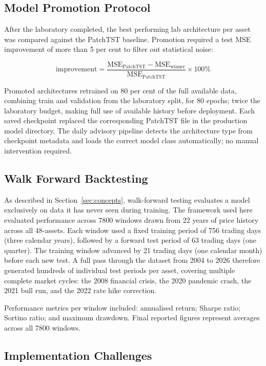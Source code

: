 \documentclass[journal]{IEEEtran}
\begin{document}
\subsection{Model Promotion Protocol}

After the laboratory completed, the best performing lab architecture per
asset was compared against the PatchTST baseline. Promotion required a
test MSE improvement of more than 5 per cent to filter out statistical
noise:

\begin{equation}
\text{improvement} = \frac{\text{MSE}_{\text{PatchTST}} -
\text{MSE}_{\text{winner}}}{\text{MSE}_{\text{PatchTST}}}
\times 100\%
\end{equation}

Promoted architectures retrained on 80 per cent of the full available
data, combining train and validation from the laboratory split, for 80
epochs; twice the laboratory budget, making full use of available history
before deployment. Each saved checkpoint replaced the corresponding
PatchTST file in the production model directory. The daily advisory
pipeline detects the architecture type from checkpoint metadata and loads
the correct model class automatically; no manual intervention required.

\subsection{Walk Forward Backtesting}

As described in Section~\ref{sec:concepts}, walk-forward testing evaluates
a model exclusively on data it has never seen during training. The
framework used here evaluated performance across 7800 windows drawn from
22 years of price history across all 48-assets. Each window used a fixed
training period of 756 trading days (three calendar years), followed by
a forward test period of 63 trading days (one quarter). The training
window advanced by 21 trading days (one calendar month) before each new
test. A full pass through the dataset from 2004 to 2026 therefore
generated hundreds of individual test periods per asset, covering
multiple complete market cycles: the 2008 financial crisis, the 2020
pandemic crash, the 2021 bull run, and the 2022 rate hike correction.

Performance metrics per window included: annualised return; Sharpe ratio;
Sortino ratio; and maximum drawdown. Final reported figures represent
averages across all 7800 windows.

\subsection{Implementation Challenges}
\end{document}
